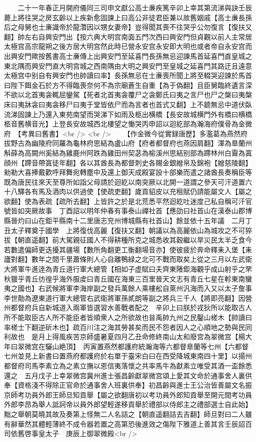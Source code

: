 　　二十一年春正月開府儀同三司申文獻公高士亷疾篤辛卯上幸其第流涕與訣壬辰薨上將往哭之房玄齡以上疾新愈固諫上曰高公非徒君臣兼以故舊姻戚【高士亷長孫后之母舅也士亷識帝於龍濳因以甥女妻帝】豈得聞其喪不往哭乎公勿復言【復扶又翻】帥左右自興安門出【按六典大明宫南面五門次西曰興安門但貞觀以前人主常居太極宫高宗龍朔之後方居大明宫然此時已營永安宫永安即大明也或者帝自永安宫而出興安門歟按舊書高士亷傳上出興安門至延喜門長孫無忌迎諫馬首延喜門直皇城之東北隅而興安門直大明宫城之西南隅由大明之興安門至皇城之延喜門其路迂且遠意太極宫中别自有興安門也帥讀曰率】長孫無忌在士亷喪所聞上將至輟哭迎諫於馬首曰陛下餌金石於方不得臨喪奈何不為宗廟蒼生自重【為于偽翻】且臣舅臨終遺言深不欲以北首夷衾輒屈鑾駕【死者北首夷衾覆尸之衾鄭氏曰夷之言尸也尸之槃曰夷槃床曰夷牀衾曰夷衾移尸曰夷于堂皆依尸而為言者也首式又翻】上不聼無忌中道伏臥流涕固諫上乃還入東苑南望而哭涕下如雨及柩出横橋【長安故城横門外有橋曰横橋柩音舊横音光】上登長安故城西北樓望之慟哭丙申詔以迴紇部為瀚海府僕骨為金微府　【考異曰舊書】<br />
<br />
　　【作金微今從實録唐歷】多濫葛為燕然府拔野古為幽陵府同羅為龜林府思結為盧山府【府者都督府也燕因肩翻】渾為臯蘭州斛薛為高闕州奚結為雞鹿州阿跌為雞田州契苾為榆溪州思結别部為蹛林州白霫為寘顔州【蹛音帶寘徒年翻】各以其酋長為都督刺史各賜金銀繒帛及錦袍【繒慈陵翻】勑勒大喜捧戴歡呼拜舞宛轉塵中及還上御天成殿宴設十部樂而遣之諸酋長奏稱臣等既為唐民往來天至尊所如詣父母請於迴紇以南突厥以北開一道謂之參天可汗道置六十八驛各有馬及酒肉以供過使【使疏吏翻】歲貢貂皮以充租賦仍請能屬文人【屬之欲翻】使為表疏【疏所去翻】上皆許之於是北荒悉平然迴紇吐迷度己私自稱可汗官號皆如突厥故事　丁酉詔以明年仲春有事泰山禪社首【應劭曰社首山在漢泰山郡博縣晉灼曰山在鉅平縣南十二里唐志兖州博城縣有社首山】餘並依十五年議　二月丁丑太子釋奠于國學　上將復伐高麗【復扶又翻】朝議以為高麗依山為城攻之不可猝拔【朝直遥翻】前大駕親征國人不得耕種所克之城悉收其穀繼以旱災民太半乏食今若數遣偏師更迭擾其疆場【數所角翻更工衡翻場音亦】使彼疲於奔命釋耒入堡【耒廬對翻】數年之間千里蕭條則人心自離鴨緑之北可不戰而取矣上從之三月以左武衛大將軍牛進逹為青丘道行軍大總管【相如子虚賦曰夫齊東陼鉅海觀乎成山射乎之罘秋獵乎青丘彷徨乎海外服䖍曰青丘國在海東三百里晉天文志有青丘七星在軫東南蠻夷之國也】右武候將軍李海岸副之發兵萬餘人乘樓舩自萊州汎海而入又以太子詹事李世勣為遼東道行軍大總管右武衛將軍孫貳朗等副之將兵三千人【將即亮翻】因營州都督府兵自新城道入兩軍皆選習水善戰者配之　辛卯上曰朕於戎狄所以能取古人所不能取臣古人所不能臣者皆順衆人之所欲故也㫺禹帥九州之民鑿山槎木【帥讀曰率槎士下翻逆斫木也】疏百川注之海其勞甚矣而民不怨者因人之心順地之勢與民同利故也　是月上得風疾苦京師盛暑夏四月乙丑命修終南山太和廢宫為翠微宫【楊大年曰翠微宫在驪山絶頂】　丙寅置燕然都護府統瀚海等六都督臯蘭等七州【六都督七州並見上新書曰置燕府都護府於右單于臺宋白曰在西受降城東南四十里】以揚州都督府司馬李素立為之素立撫以恩信夷落懷之共率馬牛為獻素立唯受其酒一盃餘悉還之　五月戊子上幸翠微宫冀州進士張昌齡獻翠微宫頌上愛其文命於通事舍人裏供奉【資格淺不得除正官命於通事舍人班裏供奉】初昌齡與進士王公治皆善屬文名振京師考功員外郎王師旦知貢舉【屬之欲翻唐初以考功員外郎知貢舉至開元間考功員外郎李昂為舉人詆訶帝以員外郎望輕遂移貢舉於禮部以侍郎主之禮部選士自此始】黜之舉朝莫曉其故及奏第上怪無二人名詰之【朝直遥翻詰去吉翻】師旦對曰二人雖有辭華然其體輕薄終不成令器若置之高第恐後進效之傷陛下雅道上善其言壬辰詔百司依舊啓事皇太子　庚辰上御翠微殿<br />

